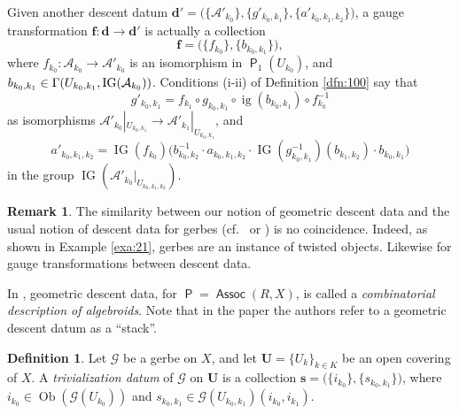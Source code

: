 \documentclass[a4paper, 10pt]{amsart}
\theoremstyle{definition}
\newtheorem{dfn}[equation]{Definition}
\newtheorem{rem}[equation]{Remark}
\numberwithin{equation}{section}
\newcommand{\opn}{\operatorname}
\newcommand{\cat}[1]{\operatorname{\mathsf{#1}}}
\newcommand{\mcal}[1]{\mathcal{#1}}
\newcommand{\bsym}[1]{\boldsymbol{#1}}
\newcommand{\gerbe}[1]{\bsym{\mcal{#1}}}
\newcommand{\twocat}[1]{\operatorname{\bsym{\cat{#1}}}}
\newcommand{\lb}{\linebreak}
\begin{document}
Given another descent datum 
$\bsym{d}' = \bigl( \{ \mcal{A}'_{k_0} \}, \{ g'_{k_0, k_1} \},
\{ a'_{k_0, k_1, k_2} \} \bigr)$,
a gauge transformation 
$\bsym{f} : \bsym{d} \to \bsym{d}'$ 
is actually a collection 
\begin{equation} \label{eqn:bitorsors.14}
\bsym{f} = \bigl( \{ f_{k_0} \}, \{ b_{k_0, k_1} \} \bigr) ,
\end{equation}
where
$f_{k_0} : \mcal{A}_{k_0} \to \mcal{A}'_{k_0}$
is an isomorphism in $\twocat{P}_1(U_{k_0})$, and
$b_{k_0, k_1} \in \lb \Gamma(U_{k_0, k_1}, \opn{IG}(\mcal{A}_{k_0}))$.
Conditions (i-ii) of Definition \ref{dfn:100} say that  
\begin{equation} \label{eqn:bitorsors.6}
g'_{k_0, k_1} =  f_{k_1} \circ g_{k_0, k_1} \circ \opn{ig}(b_{k_0, k_1})
\circ f_{k_0}^{-1}
\end{equation}
as isomorphisms 
$\mcal{A}'_{k_0}|_{U_{k_0, k_1}} \to \mcal{A}'_{k_1}|_{U_{k_0, k_1}}$,
and 
\begin{equation} \label{eqn:bitorsors.7}
a'_{k_0, k_1, k_2} = \opn{IG}(f_{k_0}) \bigl(  
b_{k_0, k_2}^{-1} \cdot a_{k_0, k_1, k_2} \cdot 
\opn{IG}(g_{k_0, k_1}^{-1})(b_{k_1, k_2}) \cdot b_{k_0, k_1} \bigr)
\end{equation}
in the group $\opn{IG}(\mcal{A}'_{k_0}|_{U_{k_0, k_1, k_2}})$.

\begin{rem}
The similarity between our notion of geometric descent data and
the usual notion of descent data for gerbes (cf.\ \cite[Section IV.3.5]{Gi} or
\cite[Section 5]{Br}) is no coincidence. Indeed, as shown in Example
\ref{exa:21}, gerbes are an instance of twisted objects. Likewise for gauge
transformations between descent data.

In \cite{Ko2}, geometric descent data, for 
$\twocat{P} = \twocat{Assoc}(R, X)$, is called a {\em combinatorial
description of algebroids}.
Note that in the paper \cite{BGNT1} the authors refer to a
geometric descent datum as a ``stack''.
\end{rem}

\begin{dfn} \label{dfn:bitorsors.3}
Let $\gerbe{G}$ be a gerbe on $X$, and let 
$\bsym{U} = \{ U_k \}_{k \in K}$ be an open covering of $X$.  
A {\em trivialization datum} of $\gerbe{G}$ on $\bsym{U}$ is a collection 
$\bsym{s} = \bigl( \{ i_{k_0} \} , \{ s_{k_0, k_1} \} \bigr)$,
where $i_{k_0} \in \opn{Ob}(\gerbe{G}(U_{k_0}))$ and 
$s_{k_0, k_1} \in \gerbe{G}(U_{k_0, k_1})(i_{k_0}, i_{k_1})$.
\end{dfn}
\end{document}
